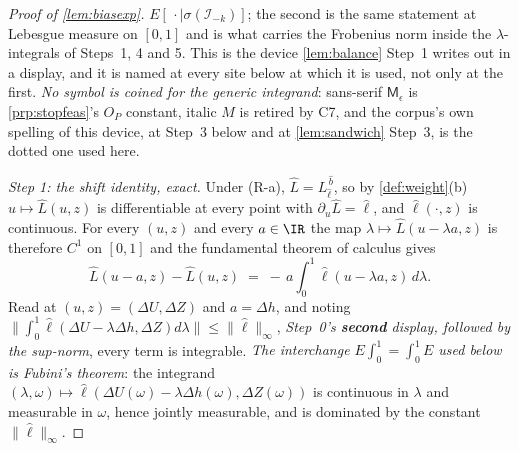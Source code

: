 \begin{proof}[Proof of \cref{lem:biasexp}]
$E[\,\cdot\mid\sigma(\mathcal I_{-k})]$; the second is the same statement at Lebesgue measure on
$[0,1]$ and is what carries the Frobenius norm inside the $\lambda$-integrals of Steps~1, 4 and 5.
This is the device \cref{lem:balance} Step~1 writes out in a display, and it is named at every
site below at which it is used, not only at the first.
\emph{No symbol is coined for the generic integrand}: sans-serif $\mathsf M_\epsilon$ is
\cref{prp:stopfeas}'s $O_P$ constant, italic $M$ is retired by C7, and the corpus's own spelling of this
device, at Step~3 below and at \cref{lem:sandwich} Step~3, is the dotted one used here.

\emph{Step 1: the shift identity, exact.} Under (R-a), $\hat L=L^{\,\hat b}_{\hat\ell}$, so by
\cref{def:weight}(b) $u\mapsto\hat L(u,z)$ is differentiable at every point with
$\partial_u\hat L=\hat\ell$, and $\hat\ell(\cdot,z)$ is continuous. For every $(u,z)$ and every $a\in\IR$
the map $\lambda\mapsto\hat L(u-\lambda a,z)$ is therefore $C^{1}$ on $[0,1]$ and the fundamental theorem of
calculus gives
\begin{equation}\label{eq:shiftFTC}
\hat L(u-a,z)-\hat L(u,z)\;=\;-\,a\int_0^1\hat\ell(u-\lambda a,z)\,d\lambda .
\end{equation}
Read at $(u,z)=(\Delta U,\Delta Z)$ and $a=\Delta h$, and noting
$\|\int_0^1\hat\ell(\Delta U-\lambda\Delta h,\Delta Z)d\lambda\|\le\|\hat\ell\|_\infty$, \emph{Step~0's
\textbf{second} display, followed by the sup-norm}, every term is
integrable. \emph{The interchange $E\int_0^1=\int_0^1E$ used below is Fubini's theorem}: the integrand
$(\lambda,\omega)\mapsto\hat\ell(\Delta U(\omega)-\lambda\Delta h(\omega),\Delta Z(\omega))$ is continuous in
$\lambda$ and measurable in $\omega$, hence jointly measurable, and is dominated by the constant
$\|\hat\ell\|_\infty$.


\end{proof}
